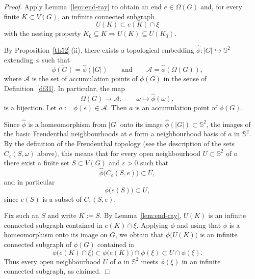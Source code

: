 \documentclass[11pt]{amsart}
\theoremstyle{plain}
\numberwithin{equation}{section}
\numberwithin{figure}{section}
\begin{document}
\begin{proof}
Apply Lemma~\ref{lem:end-ray} to obtain an end $e\in\Omega(G)$ and, for every
finite $K\subset V(G)$, an infinite connected subgraph
\[
  U(K) \subset e(K)\cap\xi
\]
with the nesting property $K_0\subseteq K \Rightarrow U(K)\subseteq U(K_0)$.

By Proposition~\ref{th52}\,(ii), there exists a topological embedding
$\widehat\phi:|G|\hookrightarrow\mathbb{S}^2$ extending $\phi$ such that
\[
  \overline{\phi(G)}=\widehat\phi(|G|)\qquad\text{and}\qquad
  \mathcal{A}=\widehat\phi(\Omega(G)),
\]
where $\mathcal{A}$ is the set of accumulation points of $\phi(G)$ in the sense of
Definition~\ref{df31}. In particular, the map
\[
  \Omega(G)\to \mathcal{A},\qquad \omega\mapsto \widehat\phi(\omega),
\]
is a bijection. Let $a:=\widehat\phi(e)\in \mathcal{A}$. Then $a$ is an accumulation
point of $\phi(G)$.

Since $\widehat\phi$ is a homeomorphism from $|G|$ onto its image
$\widehat\phi(|G|)\subset\mathbb{S}^2$, the images of the basic Freudenthal
neighbourhoods at $e$ form a neighbourhood basis of $a$ in $\mathbb{S}^2$.
By the definition of the Freudenthal topology (see the description of the
sets $C_\varepsilon(S,\omega)$ above), this means that for every open
neighbourhood $U\subset\mathbb{S}^2$ of $a$ there exist a finite set
$S\subset V(G)$ and $\varepsilon>0$ such that
\[
  \widehat\phi\bigl(C_\varepsilon(S,e)\bigr) \subset U,
\]
and in particular
\[
  \phi\bigl(e(S)\bigr) \subset U,
\]
since $e(S)$ is a subset of $C_\varepsilon(S,e)$.

Fix such an $S$ and write $K:=S$. By Lemma~\ref{lem:end-ray}, $U(K)$ is an
infinite connected subgraph contained in $e(K)\cap\xi$. Applying $\phi$ and
using that $\phi$ is a homeomorphism onto its image on $G$, we obtain that
$\phi\bigl(U(K)\bigr)$ is an infinite connected subgraph of $\phi(G)$
contained in
\[
  \phi\bigl(e(K)\cap\xi\bigr) \subset \phi\bigl(e(K)\bigr)\cap\phi(\xi)
  \subset U\cap\phi(\xi).
\]
Thus every open neighbourhood $U$ of $a$ in $\mathbb{S}^2$ meets $\phi(\xi)$
in an infinite connected subgraph, as claimed.
\end{proof}
\end{document}
